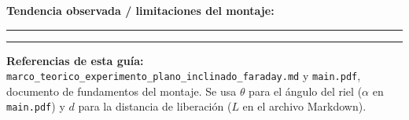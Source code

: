 \documentclass[11pt,letterpaper]{article}
\begin{document}
\textbf{Tendencia observada / limitaciones del montaje:}

\rule{\linewidth}{0.3pt}\par\vspace{0.2cm}\rule{\linewidth}{0.3pt}

\vfill
\footnotesize\textbf{Referencias de esta guía:} \texttt{marco\_teorico\_experimento\_plano\_inclinado\_faraday.md} y \texttt{main.pdf}, documento de fundamentos del montaje. Se usa $\theta$ para el ángulo del riel ($\alpha$ en \texttt{main.pdf}) y $d$ para la distancia de liberación ($L$ en el archivo Markdown).
\end{document}
